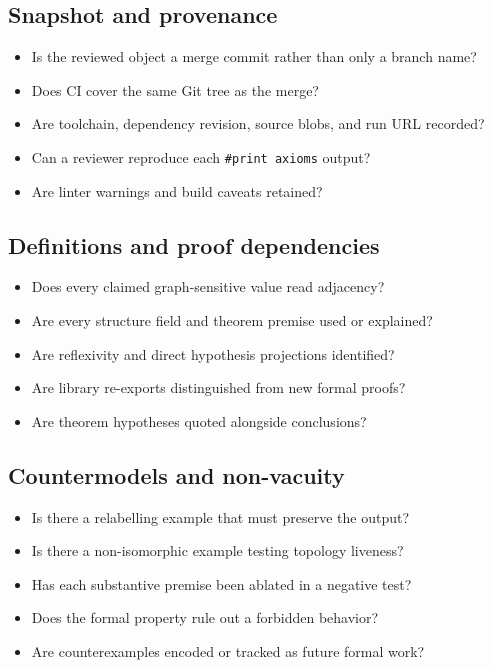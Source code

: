 \documentclass[10pt,letterpaper]{article}
\theoremstyle{definition}
\begin{document}
\subsection{Snapshot and provenance}
\begin{itemize}
\item[$\square$] Is the reviewed object a merge commit rather than only a branch
  name?
\item[$\square$] Does CI cover the same Git tree as the merge?
\item[$\square$] Are toolchain, dependency revision, source blobs, and run URL
  recorded?
\item[$\square$] Can a reviewer reproduce each \texttt{\#print axioms} output?
\item[$\square$] Are linter warnings and build caveats retained?
\end{itemize}

\subsection{Definitions and proof dependencies}
\begin{itemize}
\item[$\square$] Does every claimed graph-sensitive value read adjacency?
\item[$\square$] Are every structure field and theorem premise used or explained?
\item[$\square$] Are reflexivity and direct hypothesis projections identified?
\item[$\square$] Are library re-exports distinguished from new formal proofs?
\item[$\square$] Are theorem hypotheses quoted alongside conclusions?
\end{itemize}

\subsection{Countermodels and non-vacuity}
\begin{itemize}
\item[$\square$] Is there a relabelling example that must preserve the output?
\item[$\square$] Is there a non-isomorphic example testing topology liveness?
\item[$\square$] Has each substantive premise been ablated in a negative test?
\item[$\square$] Does the formal property rule out a forbidden behavior?
\item[$\square$] Are counterexamples encoded or tracked as future formal work?
\end{itemize}
\end{document}
